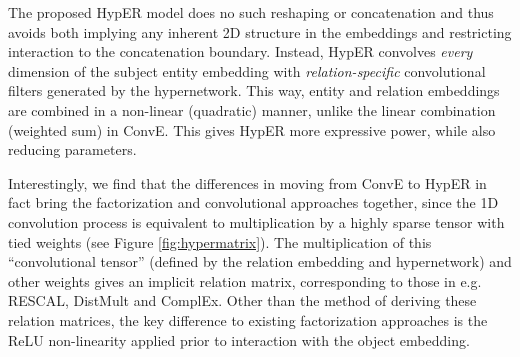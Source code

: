 \documentclass[runningheads]{llncs}
\begin{document}
The proposed HypER model does no such reshaping or concatenation and thus avoids both implying any inherent 2D structure in the embeddings and restricting interaction to the concatenation boundary. Instead, HypER convolves \emph{every} dimension of the subject entity embedding with \emph{relation-specific} convolutional filters generated by the hypernetwork. This way, entity and relation embeddings are combined in a non-linear (quadratic) manner, unlike the linear combination (weighted sum) in ConvE.  This gives HypER more expressive power, while also reducing parameters. 

Interestingly, we find that the differences in moving from ConvE to HypER in fact bring the factorization and convolutional approaches together, since the 1D convolution process is equivalent to multiplication by a highly sparse tensor with tied weights (see Figure \ref{fig:hypermatrix}). The multiplication of this ``convolutional tensor'' (defined by the relation embedding and hypernetwork) and other weights gives an implicit relation matrix, corresponding to those in  e.g. RESCAL, DistMult and ComplEx. Other than the method of deriving these relation matrices, the key difference to existing factorization approaches is the ReLU non-linearity applied prior to interaction with the object embedding. 
\end{document}
